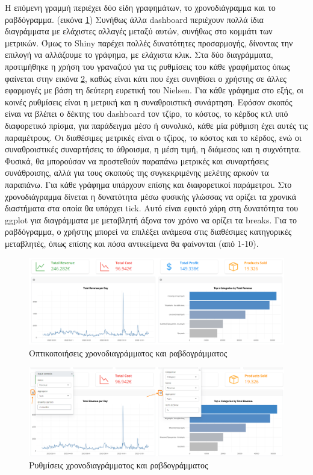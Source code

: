 \documentclass[greek, 12pt]{article}
\begin{document}
Η επόμενη γραμμή περιέχει δύο είδη γραφημάτων, το χρονοδιάγραμμα και το ραβδόγραμμα. (εικόνα \ref{fig:9}) Συνήθως άλλα dashboard περιέχουν πολλά ίδια διαγράμματα με ελάχιστες αλλαγές μεταξύ αυτών, συνήθως στο κομμάτι των μετρικών. Όμως το Shiny παρέχει πολλές δυνατότητες προσαρμογής, δίνοντας την επιλογή να αλλάζουμε το γράφημα, με ελάχιστα κλικ. Στα δύο διαγράμματα, προτιμήθηκε η χρήση του γραναζιού για τις ρυθμίσεις του κάθε γραφήματος όπως φαίνεται στην εικόνα \ref{fig:10}, καθώς είναι κάτι που έχει συνηθίσει ο χρήστης σε άλλες εφαρμογές με βάση τη δεύτερη ευρετική του Nielsen. Για κάθε γράφημα στο εξής, οι κοινές ρυθμίσεις είναι η μετρική και η συναθροιστική συνάρτηση. Εφόσον σκοπός είναι να βλέπει ο δέκτης του dashboard τον τζίρο, το κόστος, το κέρδος κτλ υπό διαφορετικό πρίσμα, για παράδειγμα μέσο ή συνολικό, κάθε μία ρύθμιση έχει αυτές τις παραμέτρους. Οι διαθέσιμες μετρικές είναι ο τζίρος, το κόστος και το κέρδος, ενώ οι συναθροιστικές συναρτήσεις το άθροισμα, η μέση τιμή, η διάμεσος και η συχνότητα. Φυσικά, θα μπορούσαν να προστεθούν παραπάνω μετρικές και συναρτήσεις συνάθροισης, αλλά για τους σκοπούς της συγκεκριμένης μελέτης αρκούν τα παραπάνω. Για κάθε γράφημα υπάρχουν επίσης και διαφορετικοί παράμετροι. Στο χρονοδιάγραμμα δίνεται η δυνατότητα μέσω φυσικής γλώσσας να ορίζει τα χρονικά διαστήματα στα οποία θα υπάρχει tick. Αυτό είναι εφικτό χάρη στη δυνατότητα του ggplot για διαγράμματα με μεταβλητή άξονα τον χρόνο να ορίζει τα breaks. Για το ραβδόγραμμα, ο χρήστης μπορεί να επιλέξει ανάμεσα στις διαθέσιμες κατηγορικές μεταβλητές, όπως επίσης και πόσα αντικείμενα θα φαίνονται (από 1-10).

\begin{figure}[h]
    \centering
    \includegraphics[width=\textwidth]{pictures/9_timeline_bar_visuals.png}
    \caption{Οπτικοποιήσεις χρονοδιαγράμματος και ραβδογράμματος}
    \label{fig:9}
\end{figure}

\begin{figure}[h]
    \centering
    \includegraphics[width=\textwidth]{pictures/10_timeline_bar_visuals_open_filters.png}
    \caption{Ρυθμίσεις χρονοδιαγράμματος και ραβδογράμματος}
    \label{fig:10}
\end{figure}
\end{document}
